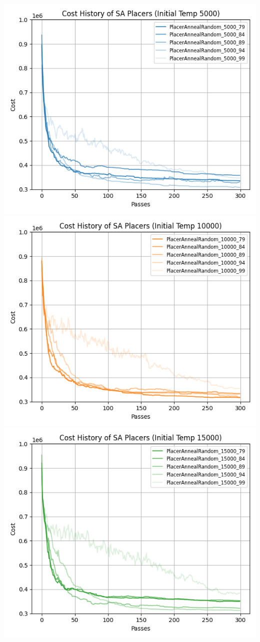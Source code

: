 {
    \centering
    \includegraphics[valign=t, scale=0.55]{figures/results/cost_history_5000.png}
    \includegraphics[valign=t, scale=0.55]{figures/results/cost_history_10000.png}
    \includegraphics[valign=t, scale=0.55]{figures/results/cost_history_15000.png}
}
